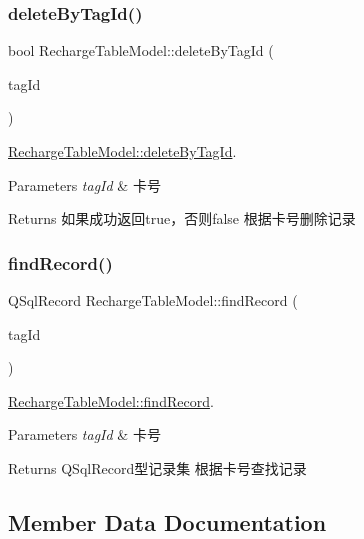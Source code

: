 \subsubsection{\texorpdfstring{deleteByTagId()}{deleteByTagId()}}
{\footnotesize\ttfamily bool Recharge\+Table\+Model\+::delete\+By\+Tag\+Id (\begin{DoxyParamCaption}\item[{const Q\+String \&}]{tag\+Id }\end{DoxyParamCaption})}



\mbox{\hyperlink{class_recharge_table_model_a184459df461ce60d8f8d1874a23ff3d8}{Recharge\+Table\+Model\+::delete\+By\+Tag\+Id}}. 


\begin{DoxyParams}{Parameters}
{\em tag\+Id} & 卡号 \\
\hline
\end{DoxyParams}
\begin{DoxyReturn}{Returns}
如果成功返回true，否则false 根据卡号删除记录 
\end{DoxyReturn}
\mbox{\label{class_recharge_table_model_a3ed6573e99f35f145d017a7adc89b5cc}} 
\subsubsection{\texorpdfstring{findRecord()}{findRecord()}}
{\footnotesize\ttfamily Q\+Sql\+Record Recharge\+Table\+Model\+::find\+Record (\begin{DoxyParamCaption}\item[{const Q\+String \&}]{tag\+Id }\end{DoxyParamCaption})}



\mbox{\hyperlink{class_recharge_table_model_a3ed6573e99f35f145d017a7adc89b5cc}{Recharge\+Table\+Model\+::find\+Record}}. 


\begin{DoxyParams}{Parameters}
{\em tag\+Id} & 卡号 \\
\hline
\end{DoxyParams}
\begin{DoxyReturn}{Returns}
Q\+Sql\+Record型记录集 根据卡号查找记录 
\end{DoxyReturn}


\subsection{Member Data Documentation}
\mbox{\label{class_recharge_table_model_a2c05ed8c1a95ed985eb26f5721e04fce}} 
